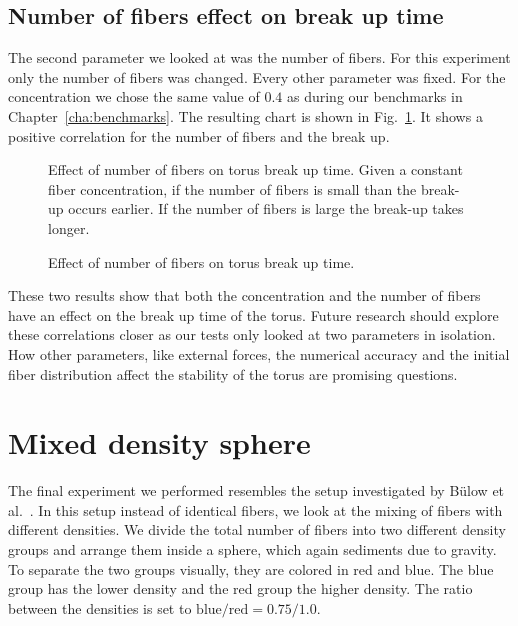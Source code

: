 \subsection{Number of fibers effect on break up time}
\label{subsec:effect_number}

The second parameter we looked at was the number of fibers. For this experiment only the number of fibers was changed. Every other parameter was fixed. For the concentration we chose the same value of $0.4$ as during our benchmarks in Chapter~\ref{cha:benchmarks}. The resulting chart is shown in Fig.~\ref{fig:number_breakup}. It shows a positive correlation for the number of fibers and the break up.

\begin{figure}[!htbp]
  \centering
  \caption[Effect of number of fibers on torus break up time.]{Effect of number of fibers on torus break up time. Given a constant fiber concentration, if the number of fibers is small than the break-up occurs earlier. If the number of fibers is large the break-up takes longer.}
  \caption{Effect of number of fibers on torus break up time.}
  \label{fig:number_breakup}
\end{figure}

These two results show that both the concentration and the number of fibers have an effect on the break up time of the torus. Future research should explore these correlations closer as our tests only looked at two parameters in isolation. How other parameters, like external forces, the numerical accuracy and the initial fiber distribution affect the stability of the torus are promising questions.

\section{Mixed density sphere}
\label{sec:mixed_density_sphere}

The final experiment we performed resembles the setup investigated by Bülow et al.~\cite{Bulow2015}. In this setup instead of identical fibers, we look at the mixing of fibers with different densities. We divide the total number of fibers into two different density groups and arrange them inside a sphere, which again sediments due to gravity. To separate the two groups visually, they are colored in red and blue. The blue group has the lower density and the red group the higher density. The ratio between the densities is set to $\text{blue} / \text{red}= 0.75 / 1.0$.

